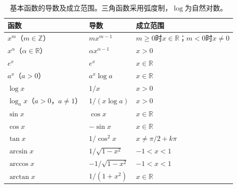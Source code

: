 \begin{table}[htbp]
 \centering\small
 \begin{tabular}{@{}lll@{}}
 \toprule
 函数 & 导数 & 成立范围\\
 \midrule
 $x^m$（$m\in\mathbb Z$） & $mx^{m-1}$ & $m\geq0$时$x\in\mathbb R$；$m<0$时$x\neq0$\\
 $x^\alpha$（$\alpha\in\mathbb R$） & $\alpha x^{\alpha-1}$ & $x>0$\\
 $e^x$ & $e^x$ & $x\in\mathbb R$\\
 $a^x$（$a>0$） & $a^x\log a$ & $x\in\mathbb R$\\
 $\log x$ & $1/x$ & $x>0$\\
 $\log_ax$（$a>0$，$a\neq1$） & $1/(x\log a)$ & $x>0$\\
 $\sin x$ & $\cos x$ & $x\in\mathbb R$\\
 $\cos x$ & $-\sin x$ & $x\in\mathbb R$\\
 $\tan x$ & $1/\cos^2x$ & $x\neq\pi/2+k\pi$\\
 $\arcsin x$ & $1/\sqrt{1-x^2}$ & $-1<x<1$\\
 $\arccos x$ & $-1/\sqrt{1-x^2}$ & $-1<x<1$\\
 $\arctan x$ & $1/(1+x^2)$ & $x\in\mathbb R$\\
 \bottomrule
 \end{tabular}
 \caption{基本函数的导数及成立范围。三角函数采用弧度制，$\log$为自然对数。}
 \label{tab:analysis-elementary-derivatives}
\end{table}
